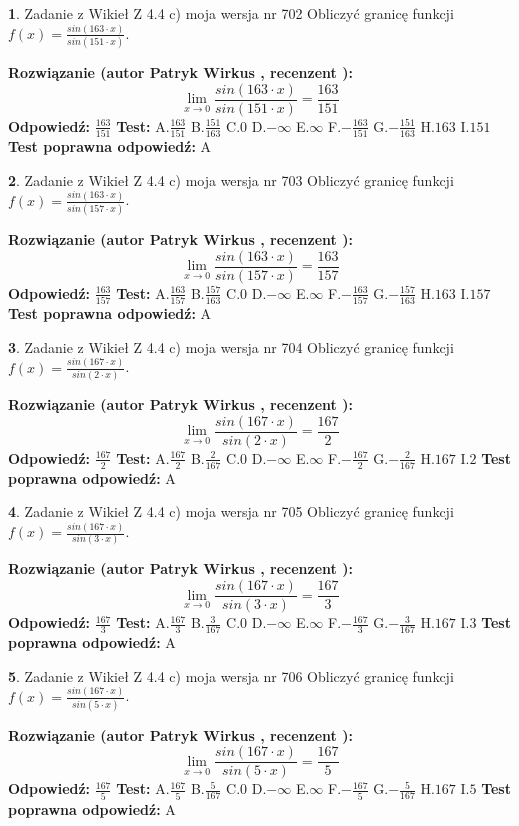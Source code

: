 \documentclass[12pt, a4paper]{article}
\theoremstyle{definition} %
\newtheorem{zad}{}
\newcommand{\zadStart}[1]{\begin{zad}#1\newline}
\newcommand{\zadStop}{\end{zad}}
\newcommand{\rozwStart}[2]{\noindent \textbf{Rozwiązanie (autor #1 , recenzent #2): }\newline}
\newcommand{\rozwStop}{\newline}
\newcommand{\odpStart}{\noindent \textbf{Odpowiedź:}\newline}
\newcommand{\odpStop}{\newline}
\newcommand{\testStart}{\noindent \textbf{Test:}\newline}
\newcommand{\testStop}{\newline}
\newcommand{\kluczStart}{\noindent \textbf{Test poprawna odpowiedź:}\newline}
\newcommand{\kluczStop}{\newline}
\begin{document}
\zadStart{Zadanie z Wikieł Z 4.4 c) moja wersja nr 702}
Obliczyć granicę funkcji $f(x)=\frac{sin(163\cdot x)}{sin(151\cdot x)}$.
\zadStop
\rozwStart{Patryk Wirkus}{}
$$\lim\limits_{x\to 0}\frac{sin(163\cdot x)}{sin(151\cdot x)}=
\frac{163}{151}$$
\rozwStop
\odpStart
$\frac{163}{151}$
\odpStop
\testStart
A.$\frac{163}{151}$
B.$\frac{151}{163}$
C.$0$
D.$-\infty$
E.$\infty$
F.$-\frac{163}{151}$
G.$-\frac{151}{163}$
H.$163$
I.$151$
\testStop
\kluczStart
A
\kluczStop



\zadStart{Zadanie z Wikieł Z 4.4 c) moja wersja nr 703}
Obliczyć granicę funkcji $f(x)=\frac{sin(163\cdot x)}{sin(157\cdot x)}$.
\zadStop
\rozwStart{Patryk Wirkus}{}
$$\lim\limits_{x\to 0}\frac{sin(163\cdot x)}{sin(157\cdot x)}=
\frac{163}{157}$$
\rozwStop
\odpStart
$\frac{163}{157}$
\odpStop
\testStart
A.$\frac{163}{157}$
B.$\frac{157}{163}$
C.$0$
D.$-\infty$
E.$\infty$
F.$-\frac{163}{157}$
G.$-\frac{157}{163}$
H.$163$
I.$157$
\testStop
\kluczStart
A
\kluczStop



\zadStart{Zadanie z Wikieł Z 4.4 c) moja wersja nr 704}
Obliczyć granicę funkcji $f(x)=\frac{sin(167\cdot x)}{sin(2\cdot x)}$.
\zadStop
\rozwStart{Patryk Wirkus}{}
$$\lim\limits_{x\to 0}\frac{sin(167\cdot x)}{sin(2\cdot x)}=
\frac{167}{2}$$
\rozwStop
\odpStart
$\frac{167}{2}$
\odpStop
\testStart
A.$\frac{167}{2}$
B.$\frac{2}{167}$
C.$0$
D.$-\infty$
E.$\infty$
F.$-\frac{167}{2}$
G.$-\frac{2}{167}$
H.$167$
I.$2$
\testStop
\kluczStart
A
\kluczStop



\zadStart{Zadanie z Wikieł Z 4.4 c) moja wersja nr 705}
Obliczyć granicę funkcji $f(x)=\frac{sin(167\cdot x)}{sin(3\cdot x)}$.
\zadStop
\rozwStart{Patryk Wirkus}{}
$$\lim\limits_{x\to 0}\frac{sin(167\cdot x)}{sin(3\cdot x)}=
\frac{167}{3}$$
\rozwStop
\odpStart
$\frac{167}{3}$
\odpStop
\testStart
A.$\frac{167}{3}$
B.$\frac{3}{167}$
C.$0$
D.$-\infty$
E.$\infty$
F.$-\frac{167}{3}$
G.$-\frac{3}{167}$
H.$167$
I.$3$
\testStop
\kluczStart
A
\kluczStop



\zadStart{Zadanie z Wikieł Z 4.4 c) moja wersja nr 706}
Obliczyć granicę funkcji $f(x)=\frac{sin(167\cdot x)}{sin(5\cdot x)}$.
\zadStop
\rozwStart{Patryk Wirkus}{}
$$\lim\limits_{x\to 0}\frac{sin(167\cdot x)}{sin(5\cdot x)}=
\frac{167}{5}$$
\rozwStop
\odpStart
$\frac{167}{5}$
\odpStop
\testStart
A.$\frac{167}{5}$
B.$\frac{5}{167}$
C.$0$
D.$-\infty$
E.$\infty$
F.$-\frac{167}{5}$
G.$-\frac{5}{167}$
H.$167$
I.$5$
\testStop
\kluczStart
A
\kluczStop
\end{document}
